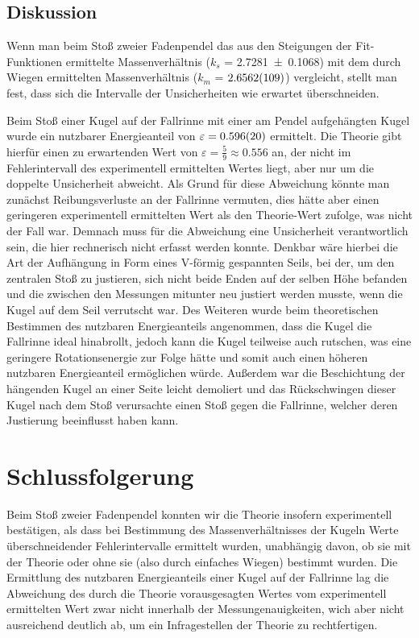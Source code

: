 \documentclass[
	a4paper,
	12pt,
	pagesize,
	ngerman
]{scrartcl}
\begin{document}
	\subsection{Diskussion}
	Wenn man beim Stoß zweier Fadenpendel das aus den Steigungen der Fit-Funktionen ermittelte Massenverhältnis ($k_s$ =  \SI{2,7281 \pm 0,1068}{}) mit dem durch Wiegen ermittelten Massenverhältnis ($k_m$ = $\SI{2,6562 \pm 0,0109}{}$) vergleicht, stellt man fest, dass sich die Intervalle der Unsicherheiten wie erwartet überschneiden.
	\par
	Beim Stoß einer Kugel auf der Fallrinne mit einer am Pendel aufgehängten Kugel wurde ein nutzbarer Energieanteil von $\varepsilon = \SI{0,596 \pm 0,02}{} $ ermittelt.
	Die Theorie gibt hierfür einen zu erwartenden Wert von $\varepsilon = \frac{\num{5}}{\num{9}} \approx \num{0,556}$ an, der nicht im Fehlerintervall des experimentell ermittelten Wertes liegt, aber nur um die doppelte Unsicherheit abweicht.
	Als Grund für diese Abweichung könnte man zunächst Reibungsverluste an der Fallrinne vermuten, dies hätte aber einen geringeren experimentell ermittelten Wert als den Theorie-Wert zufolge, was nicht der Fall war.
	Demnach muss für die Abweichung eine Unsicherheit verantwortlich sein, die hier rechnerisch nicht erfasst werden konnte.
	Denkbar wäre hierbei die Art der Aufhängung in Form eines V-förmig gespannten Seils, bei der, um den zentralen Stoß zu justieren, sich nicht beide Enden auf der selben Höhe befanden und die zwischen den Messungen mitunter neu justiert werden musste, wenn die Kugel auf dem Seil verrutscht war.
	Des Weiteren wurde beim theoretischen Bestimmen des nutzbaren Energieanteils angenommen, dass die Kugel die Fallrinne ideal hinabrollt, jedoch kann die Kugel teilweise auch rutschen, was eine geringere Rotationsenergie zur Folge hätte und somit auch einen höheren nutzbaren Energieanteil ermöglichen würde.
	Außerdem war die Beschichtung der hängenden Kugel an einer Seite leicht demoliert und das Rückschwingen dieser Kugel nach dem Stoß verursachte einen Stoß gegen die Fallrinne, welcher deren Justierung beeinflusst haben kann.
	
	\section{Schlussfolgerung}
	Beim Stoß zweier Fadenpendel konnten wir die Theorie insofern experimentell bestätigen, als dass bei Bestimmung des Massenverhältnisses der Kugeln Werte überschneidender Fehlerintervalle ermittelt wurden, unabhängig davon, ob sie mit der Theorie oder ohne sie (also durch einfaches Wiegen) bestimmt wurden.
	Die Ermittlung des nutzbaren Energieanteils einer Kugel auf der Fallrinne lag die Abweichung des durch die Theorie vorausgesagten Wertes vom experimentell ermittelten Wert zwar nicht innerhalb der Messungenauigkeiten, wich aber nicht ausreichend deutlich ab, um ein Infragestellen der Theorie zu rechtfertigen.
	
\end{document}
